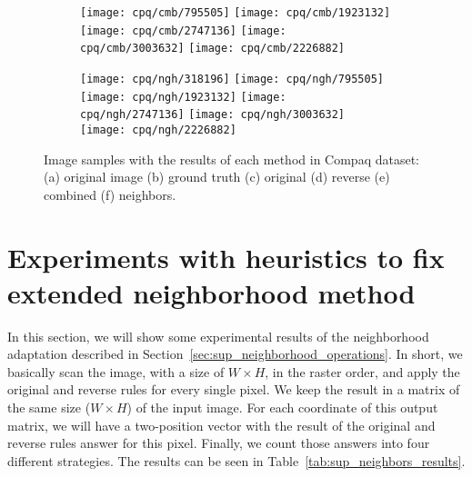 \begin{figure*}[!htb]
\begin{subfigure}[t]{0.15\textwidth}
        \texttt{[image: cpq/cmb/795505]}
        \texttt{[image: cpq/cmb/1923132]}
        \texttt{[image: cpq/cmb/2747136]}
        \texttt{[image: cpq/cmb/3003632]}
        \texttt{[image: cpq/cmb/2226882]}
        \caption{}
    \end{subfigure}
    \begin{subfigure}[t]{0.15\textwidth}
        \texttt{[image: cpq/ngh/318196]}
        \texttt{[image: cpq/ngh/795505]}
        \texttt{[image: cpq/ngh/1923132]}
        \texttt{[image: cpq/ngh/2747136]}
        \texttt{[image: cpq/ngh/3003632]}
        \texttt{[image: cpq/ngh/2226882]}
        \caption{}
    \end{subfigure}

    \caption[Image samples with the results of each method in Compaq dataset]{Image samples with the results of each method in Compaq dataset: (a) original image (b) ground truth (c) original \cite{brancati:17} (d) reverse (e) combined (f) neighbors.}
    \label{fig:results_cpq}
\end{figure*}
\clearpage

\section{Experiments with heuristics to fix extended neighborhood method}
\label{sec:sno_experiments}
In this section, we will show some experimental results of the neighborhood adaptation described in Section~\ref{sec:sup_neighborhood_operations}. In short, we basically scan the image, with a size of $W \times H$, in the raster order, and apply the original and reverse rules for every single pixel. We keep the result in a matrix of the same size ($W \times H$) of the input image. For each coordinate of this output matrix, we will have a two-position vector with the result of the original and reverse rules answer for this pixel. Finally, we count those answers into four different strategies. The results can be seen in Table~\ref{tab:sup_neighbors_results}.

